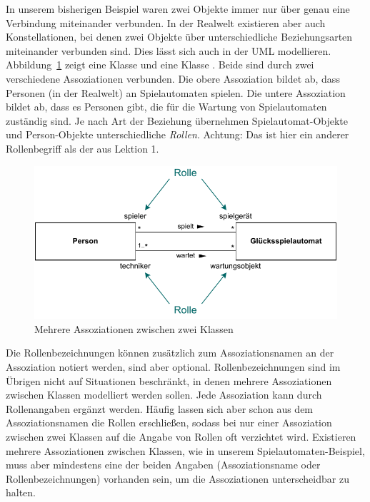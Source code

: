 
In unserem bisherigen Beispiel waren zwei Objekte immer nur über genau eine Verbindung miteinander verbunden. In der Realwelt existieren aber auch Konstellationen, bei denen zwei Objekte über unterschiedliche Beziehungsarten miteinander verbunden sind. Dies lässt sich auch in der UML modellieren. Abbildung~\ref{fig:assoziationen_zwischen_klassen} zeigt eine Klasse  und eine Klasse . Beide sind durch zwei verschiedene Assoziationen verbunden. Die obere Assoziation bildet ab, dass Personen (in der Realwelt) an Spielautomaten spielen. Die untere Assoziation bildet ab, dass es Personen gibt, die für die Wartung von Spielautomaten zuständig sind. Je nach Art der Beziehung übernehmen Spielautomat-Objekte und Person-Objekte unterschiedliche 
\textit{Rollen}. Achtung: Das ist hier ein anderer Rollenbegriff als der aus Lektion 1.

\vspace{-\baselineskip} %

\begin{figure}[h!]
	\centering
	\includegraphics{Bilder/Kapitel-4/assoziationen_zwischen_klassen.pdf}
	\caption{Mehrere Assoziationen zwischen zwei Klassen}
	\label{fig:assoziationen_zwischen_klassen}
\end{figure}

Die  Rollenbezeichnungen können zusätzlich zum Assoziationsnamen an der Assoziation notiert werden, sind aber optional. Rollenbezeichnungen sind im Übrigen nicht auf Situationen beschränkt, in denen mehrere Assoziationen zwischen Klassen modelliert werden sollen. Jede Assoziation kann durch Rollenangaben ergänzt werden. Häufig lassen sich aber schon aus dem Assoziationsnamen die Rollen erschließen, sodass bei nur einer Assoziation zwischen zwei Klassen auf die Angabe von Rollen oft verzichtet wird. Existieren mehrere Assoziationen zwischen Klassen, wie in unserem Spielautomaten-Beispiel, muss aber mindestens eine der beiden Angaben (Assoziationsname oder Rollenbezeichnungen) vorhanden sein, um die Assoziationen unterscheidbar zu halten. 

